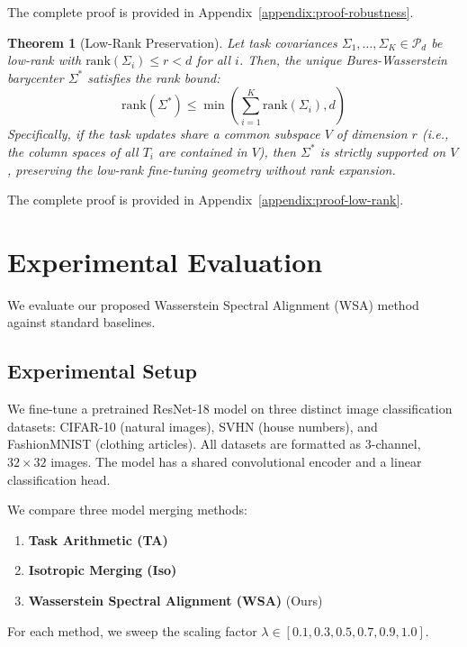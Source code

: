 \documentclass{article}
\theoremstyle{plain}
\newtheorem{theorem}{Theorem}[section]
\theoremstyle{definition}
\theoremstyle{remark}
\begin{document}
The complete proof is provided in Appendix~\ref{appendix:proof-robustness}.

\begin{theorem}[Low-Rank Preservation]
\label{thm:low_rank}
Let task covariances $\Sigma_1, \dots, \Sigma_K \in \mathcal{P}_d$ be low-rank with $\text{rank}(\Sigma_i) \le r < d$ for all $i$. Then, the unique Bures-Wasserstein barycenter $\Sigma^*$ satisfies the rank bound:
\begin{equation}
  \text{rank}(\Sigma^*) \le \min\left(\sum_{i=1}^K \text{rank}(\Sigma_i), d\right)
\end{equation}
Specifically, if the task updates share a common subspace $V$ of dimension $r$ (i.e., the column spaces of all $T_i$ are contained in $V$), then $\Sigma^*$ is strictly supported on $V$, preserving the low-rank fine-tuning geometry without rank expansion.
\end{theorem}

The complete proof is provided in Appendix~\ref{appendix:proof-low-rank}.

\section{Experimental Evaluation}
\label{submission-experiments}

We evaluate our proposed Wasserstein Spectral Alignment (WSA) method against standard baselines.

\subsection{Experimental Setup}
We fine-tune a pretrained ResNet-18 model on three distinct image classification datasets: CIFAR-10 (natural images), SVHN (house numbers), and FashionMNIST (clothing articles). All datasets are formatted as 3-channel, $32 \times 32$ images. The model has a shared convolutional encoder and a linear classification head.

We compare three model merging methods:
\begin{enumerate}
  \item \textbf{Task Arithmetic (TA)} \cite{ilharco22}
  \item \textbf{Isotropic Merging (Iso)} \cite{saim}
  \item \textbf{Wasserstein Spectral Alignment (WSA)} (Ours)
\end{enumerate}
For each method, we sweep the scaling factor $\lambda \in [0.1, 0.3, 0.5, 0.7, 0.9, 1.0]$.
\end{document}
